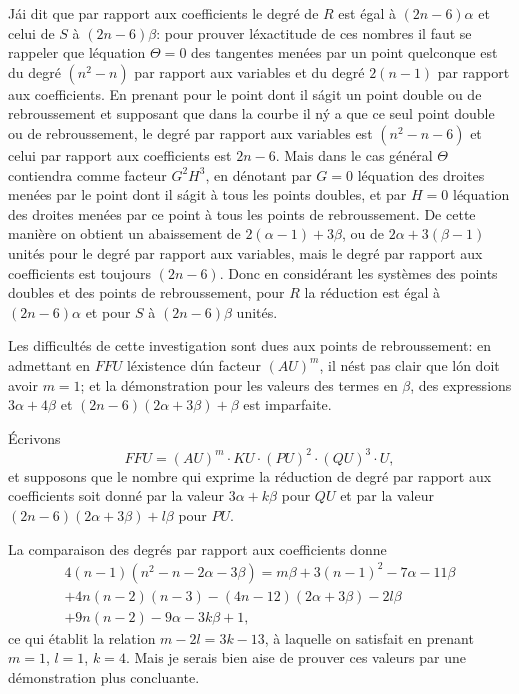 \documentclass[11pt,a4paper]{article}
\theoremstyle{plain}
\begin{document}
J\'ai dit que par rapport aux coefficients le degr\'e de $R$ est \'egal \`a $(2n-6)\alpha$ et celui de $S$ \`a $(2n-6)\beta$: pour prouver l\'exactitude de ces nombres il faut se rappeler que l\'equation $\Theta=0$ des tangentes men\'ees par un point quelconque est du degr\'e $(n^2-n)$ par rapport aux variables et du degr\'e $2(n-1)$ par rapport aux coefficients. En prenant pour le point dont il s\'agit un point double ou de rebroussement et supposant que dans la courbe il n\'y a que ce seul point double ou de rebroussement, le degr\'e par rapport aux variables est $(n^2-n-6)$ et celui par rapport aux coefficients est $2n-6$. Mais dans le cas g\'en\'eral $\Theta$ contiendra comme facteur $G^2H^3$, en d\'enotant par $G=0$ l\'equation des droites men\'ees par le point dont il s\'agit \`a tous les points doubles, et par $H=0$ l\'equation des droites men\'ees par ce point \`a tous les points de rebroussement. De cette mani\`ere on obtient un abaissement de $2(\alpha-1)+3\beta$, ou de $2\alpha+3(\beta-1)$ unit\'es pour le degr\'e par rapport aux variables, mais le degr\'e par rapport aux coefficients est toujours $(2n-6)$. Donc en consid\'erant les syst\`emes des points doubles et des points de rebroussement, pour $R$ la r\'eduction est \'egal \`a $(2n-6)\alpha$ et pour $S$ \`a $(2n-6)\beta$ unit\'es.

Les difficult\'es de cette investigation sont dues aux points de rebroussement: en admettant en $FFU$ l\'existence d\'un facteur $(AU)^m$, il n\'est pas clair que l\'on doit avoir $m=1$; et la d\'emonstration pour les valeurs des termes en $\beta$, des expressions $3\alpha+4\beta$ et $(2n-6)(2\alpha+3\beta) + \beta$ est imparfaite.

\'Ecrivons
\[
FFU = (AU)^m \cdot KU \cdot (PU)^2 \cdot (QU)^3 \cdot U,
\]
et supposons que le nombre qui exprime la r\'eduction de degr\'e par rapport aux coefficients soit donn\'e par la valeur $3\alpha + k\beta$ pour $QU$ et par la valeur $(2n-6)(2\alpha+3\beta) + l\beta$ pour $PU$.

La comparaison des degr\'es par rapport aux coefficients donne
\begin{multline*}
4(n-1)(n^2-n-2\alpha-3\beta) = m\beta + 3(n-1)^2 - 7\alpha - 11\beta \\
+ 4n(n-2)(n-3) - (4n-12)(2\alpha+3\beta) - 2l\beta \\
+ 9n(n-2) - 9\alpha - 3k\beta + 1,
\end{multline*}
ce qui \'etablit la relation $m - 2l = 3k - 13$, \`a laquelle on satisfait en prenant $m=1$, $l=1$, $k=4$. Mais je serais bien aise de prouver ces valeurs par une d\'emonstration plus concluante.
\end{document}
